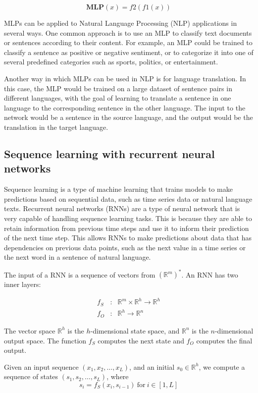 $$
\mathbf{MLP}(x) = f2(f1(x))
$$

MLPs can be applied to Natural Language Processing (NLP) applications in several ways. One common approach is to use an MLP to classify text documents or sentences according to their content. For example, an MLP could be trained to classify a sentence as positive or negative sentiment, or to categorize it into one of several predefined categories such as sports, politics, or entertainment.

Another way in which MLPs can be used in NLP is for language translation. In this case, the MLP would be trained on a large dataset of sentence pairs in different languages, with the goal of learning to translate a sentence in one language to the corresponding sentence in the other language. The input to the network would be a sentence in the source language, and the output would be the translation in the target language.

\subsection{Sequence learning with recurrent neural networks}
\label{sec:rnn}
Sequence learning is a type of machine learning that trains models to make predictions based on sequential data, such as time series data or natural language texts. Recurrent neural networks (RNNs) are a type of neural network that is very capable of handling sequence learning tasks. This is because they are able to retain information from previous time steps and use it to inform their prediction of the next time step. This allows RNNs to make predictions about data that has dependencies on previous data points, such as the next value in a time series or the next word in a sentence of natural language.

The input of a RNN is a sequence of vectors from $(\mathbb{R}^m)^*$.
An RNN has two inner layers:

\begin{eqnarray*}
    f_S &:& \mathbb{R}^{m} \times \mathbb{R}^{h} \to \mathbb{R}^h \\
    f_O &:& \mathbb{R}^{h}\to\mathbb{R}^n
\end{eqnarray*}

The vector space $\mathbb{R}^h$ is the $h$-dimensional state space,
and $\mathbb{R}^n$ is the $n$-dimensional output space.  The function $f_S$ computes the next state and $f_O$ computes the final output.

Given an input sequence $(x_1, x_2, \dots, x_L)$, and 
an initial $s_0\in\mathbb{R}^h$, we compute a sequence of states $(s_1, s_2, \dots, s_L)$, where
$$
s_i = f_S(x_i, s_{i-1})\ \mathrm{for}\ i\in[1, L]
$$

